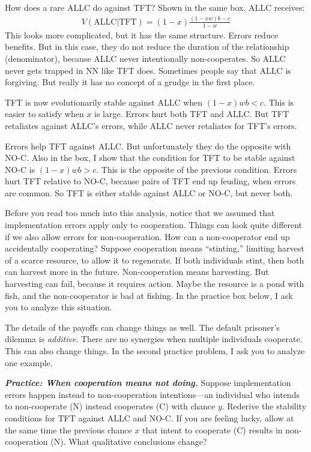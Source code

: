 \documentclass[10pt,reqno]{amsbook}
\numberwithin{equation}{chapter}
\newenvironment{mathboxmp}[1]
{\begin{tcolorbox}[breakable, enhanced, oversize]\footnotesize\noindent\textbf{\emph{#1}}}
{\end{tcolorbox}}
\begin{document}
How does a rare ALLC do against TFT? Shown in the same box, ALLC receives:
\begin{align*}
	V(\text{ALLC}|\text{TFT}) = (1-x)\frac{(1-xw)b-c}{1-w}
\end{align*}
This looks more complicated, but it has the same structure. Errors reduce benefits. But in this case, they do not reduce the duration of the relationship (denominator), because ALLC never intentionally non-cooperates. So ALLC never gets trapped in NN like TFT does. Sometimes people say that ALLC is forgiving. But really it has no concept of a grudge in the first place. 

TFT is now evolutionarily stable against ALLC when $(1-x)wb < c$. This is easier to satisfy when $x$ is large. Errors hurt both TFT and ALLC. But TFT retaliates against ALLC's errors, while ALLC never retaliates for TFT's errors.

Errors help TFT against ALLC. But unfortunately they do the opposite with NO-C. Also in the box, I show that the condition for TFT to be stable against NO-C is $(1-x)wb > c$. This is the opposite of the previous condition. Errors hurt TFT relative to NO-C, because pairs of TFT end up feuding, when errors are common. So TFT is either stable against ALLC or NO-C, but never both.

Before you read too much into this analysis, notice that we assumed that implementation errors apply only to cooperation. Things can look quite different if we also allow errors for non-cooperation. How can a non-cooperator end up accidentally cooperating? Suppose cooperation means ``stinting,'' limiting harvest of a scarce resource, to allow it to regenerate. If both individuals stint, then both can harvest more in the future. Non-cooperation means harvesting. But harvesting can fail, because it requires action. Maybe the resource is a pond with fish, and the non-cooperator is bad at fishing. In the practice box below, I ask you to analyze this situation.

The details of the payoffs can change things as well. The default prisoner's dilemma is \emph{additive}. There are no synergies when multiple individuals cooperate. This can also change things. In the second practice problem, I ask you to analyze one example.

\begin{mathboxmp}{Practice: When cooperation means not doing.}
Suppose implementation errors happen instead to non-cooperation intentions---an individual who intends to non-cooperate (N) instead cooperates (C) with chance $y$. Rederive the stability conditions for TFT against ALLC and NO-C. If you are feeling lucky, allow at the same time the previous chance $x$ that intent to cooperate (C) results in non-cooperation (N). What qualitative conclusions change?
\end{mathboxmp}
\end{document}
